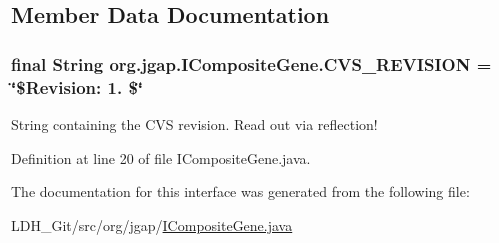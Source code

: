 \subsection{Member Data Documentation}
\hypertarget{interfaceorg_1_1jgap_1_1_i_composite_gene_a4cfd0957faa0fbf511876986728e6be5}{
\subsubsection[{C\-V\-S\-\_\-\-R\-E\-V\-I\-S\-I\-O\-N}]{\setlength{\rightskip}{0pt plus 5cm}final String org.\-jgap.\-I\-Composite\-Gene.\-C\-V\-S\-\_\-\-R\-E\-V\-I\-S\-I\-O\-N = \char`\"{}\$Revision\-: 1. \$\char`\"{}\hspace{0.3cm}{\ttfamily [static]}}}\label{interfaceorg_1_1jgap_1_1_i_composite_gene_a4cfd0957faa0fbf511876986728e6be5}
String containing the C\-V\-S revision. Read out via reflection! 

Definition at line 20 of file I\-Composite\-Gene.\-java.



The documentation for this interface was generated from the following file\-:\begin{DoxyCompactItemize}
\item 
L\-D\-H\-\_\-\-Git/src/org/jgap/\hyperlink{_i_composite_gene_8java}{I\-Composite\-Gene.\-java}\end{DoxyCompactItemize}
